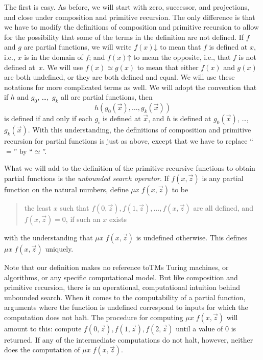 \documentclass[10pt,a4paper]{article}
\theoremstyle{plain}
\theoremstyle{definition}
\theoremstyle{remark}
\newenvironment{explain}{}{}
\providecommand{\iftag}[1]{#1}
\providecommand{\fdefined}{\mathord{\downarrow}}
\providecommand{\fundefined}{\mathord{\uparrow}}
\begin{document}
The first is easy. As before, we will start with zero, successor, and
projections, and close under composition and primitive recursion. The
only difference is that we have to modify the definitions of
composition and primitive recursion to allow for the possibility that
some of the terms in the definition are not defined. If $f$ and $g$
are partial functions, we will write $f(x) \fdefined$ to mean that $f$
is defined at $x$, i.e., $x$ is in the domain of $f$; and $f(x)
\fundefined$ to mean the opposite, i.e., that $f$ is not defined at~$x$.
We will use $f(x) \simeq g(x)$ to mean that either $f(x)$ and $g(x)$
are both undefined, or they are both defined and equal. We will use these
notations for more complicated terms as well. We will adopt the
convention that if $h$ and $g_0$, \dots,~$g_k$ all are partial functions,
then
\[
h(g_0(\vec x),\dots,g_k(\vec x))
\]
is defined if and only if each $g_i$ is defined at $\vec x$, and $h$
is defined at $g_0(\vec x)$, \dots,~$g_k(\vec x)$. With this
understanding, the definitions of composition and primitive recursion
for partial functions is just as above, except that we have to replace
``$=$'' by ``$\simeq$''.

What we will add to the definition of the primitive recursive
functions to obtain partial functions is the \emph{unbounded search
  operator}. If $f(x,\vec z)$ is any partial function on the natural
numbers, define $\mu x \; f(x,\vec z)$ to be
\begin{quote}
  the least $x$ such that $f(0,\vec z), f(1,\vec z), \dots, f(x,\vec
  z)$ are all defined, and $f(x,\vec z) = 0$, if such an $x$ exists
\end{quote}
with the understanding that $\mu x \; f(x,\vec z)$ is undefined
otherwise. This defines $\mu x \; f(x,\vec z)$ uniquely.

\begin{explain}
Note that our definition makes no reference to\iftag{TMs}{ Turing
  machines, or}{} algorithms, or any specific computational model. But
like composition and primitive recursion, there is an operational,
computational intuition behind unbounded search. When it
comes to the computability of a partial function, arguments
where the function is undefined correspond to inputs for which the
computation does not halt. The procedure for computing $\mu x \;
f(x,\vec z)$ will amount to this: compute $f(0,\vec z), f(1,\vec z),
f(2,\vec z)$ until a value of 0 is returned. If any of the
intermediate computations do not halt, however, neither does the
computation of $\mu x \; f(x,\vec z)$.
\end{explain}
\end{document}
